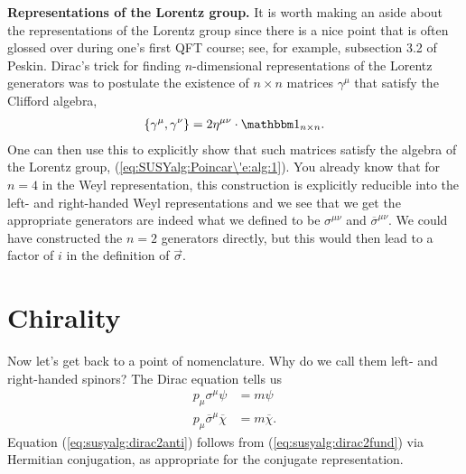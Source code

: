 \begin{example}
    \noindent\textbf{Representations of the Lorentz group.} %
    It is worth making an aside about the representations of the Lorentz group since there is a nice point that is often glossed over during one's first QFT course; see, for example, subsection 3.2 of Peskin\autocite{Peskin:1995ev}. Dirac's trick for finding $n$-dimensional representations of the Lorentz generators was to postulate the existence of $n\times n$ matrices $\gamma^\mu$ that satisfy the Clifford algebra,
    \begin{align}
        \{\gamma^\mu,\gamma^\nu\} = 2\eta^{\mu\nu}\cdot\mathbbm 1_{n\times n}.
    \end{align}
One can then use this to explicitly show that such matrices satisfy the algebra of the Lorentz group,  (\ref{eq:SUSYalg:Poincar\'e:alg:1}). You already know that for $n=4$ in the Weyl representation, this construction is explicitly reducible into the left- and right-handed Weyl representations and we see that we get the appropriate generators are indeed what we defined to be $\sigma^{\mu\nu}$ and $\overline\sigma^{\mu\nu}$. We could have constructed the $n=2$ generators directly, but this would then lead to a factor of $i$ in the definition of $\vec\sigma$. 
\end{example}

\section{Chirality}\label{sec:SUSYalg:sec:chirality}

Now let's get back to a point of nomenclature. Why do we call them left- and right-handed spinors? The Dirac equation tells us
\begin{align}
    p_\mu\sigma^\mu \psi &= m \psi\label{eq:susyalg:dirac2fund}\\
    p_\mu\overline\sigma^\mu \overline\chi &= m \overline\chi\label{eq:susyalg:dirac2anti}.
\end{align}
Equation (\ref{eq:susyalg:dirac2anti}) follows from  (\ref{eq:susyalg:dirac2fund}) via Hermitian conjugation, as appropriate for the conjugate representation. 

